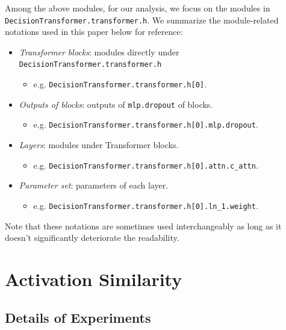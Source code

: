 \documentclass{article}
\begin{document}
Among the above modules, for our analysis, we focus on the modules in \lstinline{DecisionTransformer.transformer.h}. We summarize the module-related notations used in this paper below for reference:
\begin{itemize}
    \item \textit{Transformer blocks}: modules directly under
    \lstinline{DecisionTransformer.transformer.h}
        \begin{itemize}
            \item e.g. \lstinline{DecisionTransformer.transformer.h[0]}.
        \end{itemize}
    \item \textit{Outputs of blocks}: outputs of \lstinline{mlp.dropout} of blocks.
        \begin{itemize}
            \item e.g. \lstinline{DecisionTransformer.transformer.h[0].mlp.dropout}.
        \end{itemize}
    \item \textit{Layers}: modules under Transformer blocks.
        \begin{itemize}
            \item e.g. \lstinline{DecisionTransformer.transformer.h[0].attn.c_attn}.
        \end{itemize}
    \item \textit{Parameter set}: parameters of each layer.
        \begin{itemize}
            \item e.g. \lstinline{DecisionTransformer.transformer.h[0].ln_1.weight}.
        \end{itemize}
\end{itemize}
Note that these notations are sometimes used interchangeably as long as it doesn't significantly deteriorate the readability. 

\section{Activation Similarity}
\label{appendix:activation-similarity}

\subsection{Details of Experiments}
\label{appendix:detail-of-experiments-activation-similarity}
\end{document}
